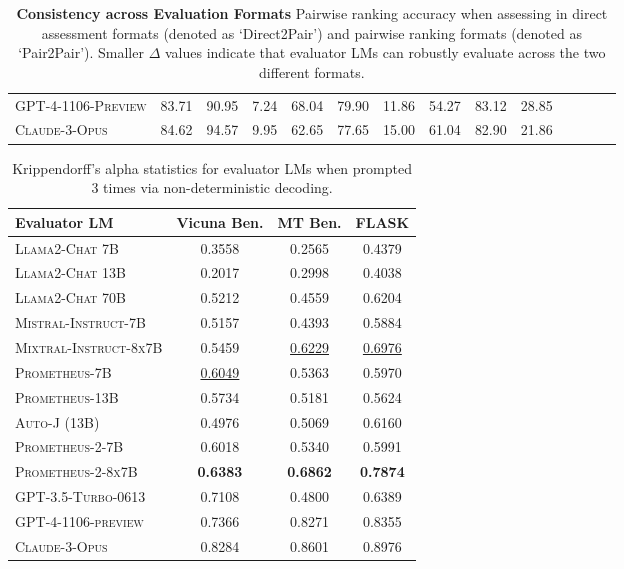 \documentclass[11pt]{article}
\begin{document}
\begin{table}
{\begin{tabular}{lccccccccccccc}
    \textsc{GPT-4-1106-Preview}&83.71&90.95&7.24&68.04&79.90&11.86&54.27&83.12&28.85\\
    \textsc{Claude-3-Opus}&84.62&94.57&9.95&62.65&77.65&15.00&61.04&82.90&21.86\\
    \bottomrule    
\end{tabular}}
\caption{\footnotesize \textbf{Consistency across Evaluation Formats} Pairwise ranking accuracy when assessing in direct assessment formats (denoted as `Direct2Pair') and pairwise ranking formats (denoted as `Pair2Pair'). Smaller $\Delta$ values indicate that evaluator LMs can robustly evaluate across the two different formats.}
\label{table:relative_diff}
\end{table}  

\clearpage

\begin{table}[H]
\centering
\fontsize{7}{9}\selectfont
{
\begin{tabular}{lccc}
\toprule
\textbf{Evaluator LM} & Vicuna Ben. & MT Ben. & FLASK\\
    \midrule
    \textsc{Llama2-Chat 7B}  & 0.3558 & 0.2565 & 0.4379\\
    \textsc{Llama2-Chat 13B} & 0.2017 & 0.2998 & 0.4038\\
    \textsc{Llama2-Chat 70B} & 0.5212 & 0.4559 & 0.6204\\
    \textsc{Mistral-Instruct-7B} & 0.5157 & 0.4393 & 0.5884 \\
    \textsc{Mixtral-Instruct-8x7B} & 0.5459 & \underline{0.6229} & \underline{0.6976} \\
    \textsc{Prometheus-7B} & \underline{0.6049} & 0.5363 & 0.5970 \\
    \textsc{Prometheus-13B} & 0.5734 & 0.5181 & 0.5624 \\
    \textsc{Auto-J (13B)} & 0.4976 & 0.5069 & 0.6160 \\
    \textsc{Prometheus-2-7B} & 0.6018 & 0.5340 & 0.5991 \\
    \textsc{Prometheus-2-8x7B} & \textbf{0.6383} & \textbf{0.6862} & \textbf{0.7874} \\
    \midrule
    \textsc{GPT-3.5-Turbo-0613} & 0.7108 & 0.4800 & 0.6389 \\
    \textsc{GPT-4-1106-preview} & 0.7366 & 0.8271 & 0.8355 \\
    \textsc{Claude-3-Opus} & 0.8284 & 0.8601 & 0.8976\\
    \bottomrule    
\end{tabular}}
\caption{\footnotesize Krippendorff's alpha statistics for evaluator LMs when prompted 3 times via non-deterministic decoding.}
\label{table:krippendorff}
\end{table}
\end{document}
